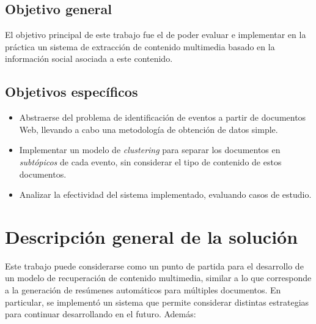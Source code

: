 \documentclass[upright, contnum]{umemoria}
\begin{document}
\subsection{Objetivo general}
\label{sec-1.2.1}

    
    El objetivo principal de este trabajo fue el de poder evaluar e
    implementar en la práctica un sistema de extracción de contenido
    multimedia basado en la información social asociada a este
    contenido.

\subsection{Objetivos específicos}
\label{sec-1.2.2}


\begin{itemize}
\item Abstraerse del problema de identificación de eventos a partir de
      documentos Web, llevando a cabo una metodología de obtención de
      datos simple.
\item Implementar un modelo de \emph{clustering} para separar los
      documentos en \emph{subtópicos} de cada evento, sin considerar el
      tipo de contenido de estos documentos.
\item Analizar la efectividad del sistema implementado, evaluando
      casos de estudio.
\end{itemize}
\section{Descripción general de la solución}
\label{sec-1.3}

   
   Este trabajo puede considerarse como un punto de partida para el
   desarrollo de un modelo de recuperación de contenido multimedia,
   similar a lo que corresponde a la generación de resúmenes
   automáticos para múltiples documentos. En particular, se implementó
   un sistema que permite considerar distintas estrategias para
   continuar desarrollando en el futuro. Además:
\end{document}
